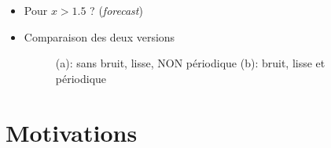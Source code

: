 \documentclass[xcolor=svgnames, t]{beamer}
\newcommand{\coloredemph}[1]{\textcolor{internationalblue}{\emph{#1}}}
\begin{document}
\begin{frame}{\subsecname}
  \begin{itemize}
    \item<1-> Pour $x > 1.5$ ? (\coloredemph{forecast})
    \item<1-> Comparaison des deux versions 
      \begin{figure}
        \centering
        \caption{(a): sans bruit, lisse, NON périodique (b): bruit, lisse et périodique}
      \end{figure}
  \end{itemize}
\end{frame}

\section{Motivations}
\end{document}

